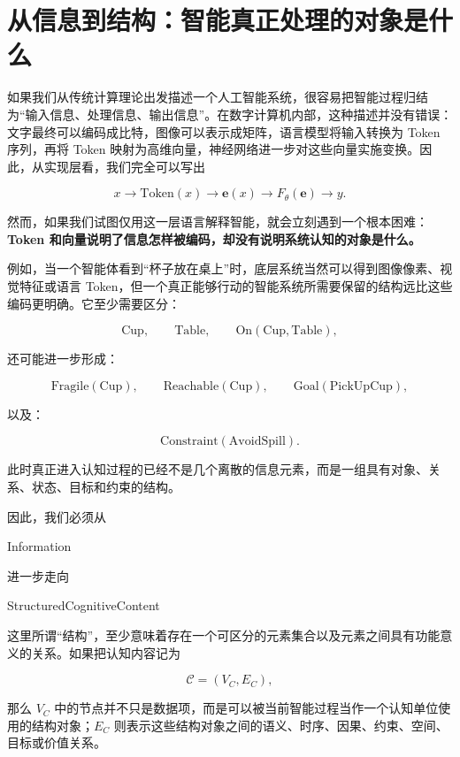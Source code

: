 \section{从信息到结构：智能真正处理的对象是什么}

如果我们从传统计算理论出发描述一个人工智能系统，很容易把智能过程归结为“输入信息、处理信息、输出信息”。在数字计算机内部，这种描述并没有错误：文字最终可以编码成比特，图像可以表示成矩阵，语言模型将输入转换为 Token 序列，再将 Token 映射为高维向量，神经网络进一步对这些向量实施变换。因此，从实现层看，我们完全可以写出

\[
x
\rightarrow
\mathrm{Token}(x)
\rightarrow
\mathbf e(x)
\rightarrow
F_{\theta}(\mathbf e)
\rightarrow
y.
\]

然而，如果我们试图仅用这一层语言解释智能，就会立刻遇到一个根本困难：\textbf{Token 和向量说明了信息怎样被编码，却没有说明系统认知的对象是什么。}

例如，当一个智能体看到“杯子放在桌上”时，底层系统当然可以得到图像像素、视觉特征或语言 Token，但一个真正能够行动的智能系统所需要保留的结构远比这些编码更明确。它至少需要区分：

\[
\mathrm{Cup},
\qquad
\mathrm{Table},
\qquad
\mathrm{On}(\mathrm{Cup},\mathrm{Table}),
\]

还可能进一步形成：

\[
\mathrm{Fragile}(\mathrm{Cup}),
\qquad
\mathrm{Reachable}(\mathrm{Cup}),
\qquad
\mathrm{Goal}(\mathrm{PickUpCup}),
\]

以及：

\[
\mathrm{Constraint}
\left(
\mathrm{AvoidSpill}
\right).
\]

此时真正进入认知过程的已经不是几个离散的信息元素，而是一组具有对象、关系、状态、目标和约束的结构。

因此，我们必须从

\begin{statementbox}
Information
\end{statementbox}

进一步走向

\begin{statementbox}
StructuredCognitiveContent
\end{statementbox}

这里所谓“结构”，至少意味着存在一个可区分的元素集合以及元素之间具有功能意义的关系。如果把认知内容记为

\[
\mathcal C
=
(V_C,E_C),
\]

那么 \(V_C\) 中的节点并不只是数据项，而是可以被当前智能过程当作一个认知单位使用的结构对象；\(E_C\) 则表示这些结构对象之间的语义、时序、因果、约束、空间、目标或价值关系。

